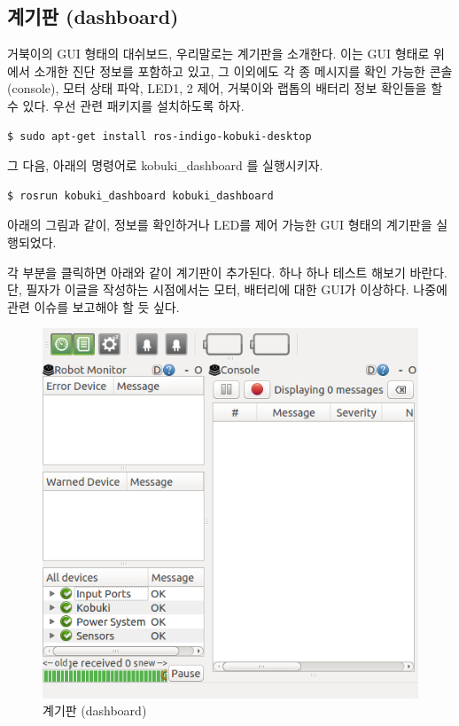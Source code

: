 \subsection{계기판 (dashboard)}

거북이의 GUI 형태의 대쉬보드, 우리말로는 계기판을 소개한다. 이는 GUI 형태로 위에서 소개한 진단 정보를 포함하고 있고, 그 이외에도 각 종 메시지를 확인 가능한 콘솔(console), 모터 상태 파악, LED1, 2 제어, 거북이와 랩톱의 배터리 정보 확인들을 할 수 있다. 우선 관련 패키지를 설치하도록 하자.

\vspace{\baselineskip}
\begin{lstlisting}[language=ROS]
$ sudo apt-get install ros-indigo-kobuki-desktop
\end{lstlisting}

\noindent
그 다음, 아래의 명령어로 kobuki\_dashboard 를 실행시키자.

\vspace{\baselineskip}
\begin{lstlisting}[language=ROS]
$ rosrun kobuki_dashboard kobuki_dashboard
\end{lstlisting}

아래의 그림과 같이, 정보를 확인하거나 LED를 제어 가능한 GUI 형태의 계기판을 실행되었다. 

각 부분을 클릭하면 아래와 같이 계기판이 추가된다. 하나 하나 테스트 해보기 바란다. 단, 필자가 이글을 작성하는 시점에서는 모터, 배터리에 대한 GUI가 이상하다. 나중에 관련 이슈를 보고해야 할 듯 싶다.

\begin{figure}[h]
\centering\includegraphics[width=0.7\columnwidth]{pictures/chapter10/kobuki_dashboard.png}
\caption{계기판 (dashboard)}
\end{figure}


